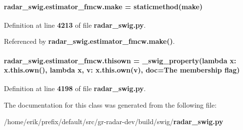 \paragraph[{make}]{\setlength{\rightskip}{0pt plus 5cm}radar\+\_\+swig.\+estimator\+\_\+fmcw.\+make = staticmethod(make)\hspace{0.3cm}{\ttfamily [static]}}\label{classradar__swig_1_1estimator__fmcw_ac691ce812abf15d0aeb480851c75b9d3}


Definition at line {\bf 4213} of file {\bf radar\+\_\+swig.\+py}.



Referenced by {\bf radar\+\_\+swig.\+estimator\+\_\+fmcw.\+make()}.

\paragraph[{thisown}]{\setlength{\rightskip}{0pt plus 5cm}radar\+\_\+swig.\+estimator\+\_\+fmcw.\+thisown = {\bf \+\_\+swig\+\_\+property}(lambda x\+: x.\+this.\+own(), lambda {\bf x}, v\+: x.\+this.\+own(v), doc=\textquotesingle{}The membership flag\textquotesingle{})\hspace{0.3cm}{\ttfamily [static]}}\label{classradar__swig_1_1estimator__fmcw_a05da513896903b9a0caeb05d2a0c7f45}


Definition at line {\bf 4198} of file {\bf radar\+\_\+swig.\+py}.



The documentation for this class was generated from the following file\+:\begin{DoxyCompactItemize}
\item 
/home/erik/prefix/default/src/gr-\/radar-\/dev/build/swig/{\bf radar\+\_\+swig.\+py}\end{DoxyCompactItemize}
